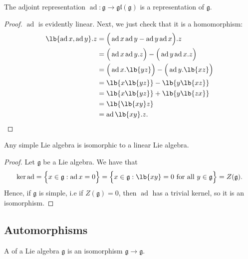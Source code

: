\documentclass{article}
\DeclarePairedDelimiter\lb\lbrack\rbrack
\newcommand*\ad{\operatorname{ad}}
\newcommand*\frkg{{\ensuremath{\mathfrak{g}}}}
\newcommand*\gl{\ensuremath{\mathfrak{gl}}}
\newcommand*\acts{.}
\begin{document}
\begin{theorem}
    The adjoint representation $\ad: \frkg \to \gl(\frkg)$ is a representation of $\frkg$.
\end{theorem}

\begin{proof}
    $\ad$ is evidently linear.
    Next, we just check that it is a homomorphism:
    \begin{align*}
        \lb{\ad x, \ad y} \acts z
        &=
        \Big(\ad x \ad y - \ad y \ad x\Big) \acts z 
        \\
        &=
        \Big(\ad x \ad y \acts z\Big) - \Big(\ad y \ad x \acts z\Big) 
        \\
        &=
        \Big(
            \ad x \acts \lb{yz}
        \Big)
        - 
        \Big(
            \ad y \acts \lb{xz}
        \Big)
        \\
        &=
        \lb{x\lb{yz}} - \lb{y\lb{xz}}
        \\
        &=
        \lb{x\lb{yz}} + \lb{y\lb{zx}}
        \\
        &=
        \lb{\lb{xy}z}
        \\
        &=
        \ad \lb{xy} \acts z.
    \end{align*}
\end{proof}

\begin{corollary}
    Any simple Lie algebra is isomorphic to a linear Lie algebra.
\end{corollary}

\begin{proof}
    Let $\frkg$ be a Lie algebra.
    We have that
    \[
        \ker \ad 
        =
        \Big\{
            x \in \frkg: \ad x = 0
        \Big\}
        =
        \Big\{
            x \in \frkg: \lb{xy} = 0 \text{ for all } y \in \frkg
        \Big\}
        =
        Z(\frkg).
    \]
    Hence, if $\frkg$ is simple, i.e if $Z(\frkg) = 0$, then $\ad$ has a trivial kernel, so it is an isomorphism. 
\end{proof}

\subsection{Automorphisms}

\begin{definition}
    A  of a Lie algebra $\frkg$ is an isomorphism $\frkg \to \frkg$.
\end{definition}
\end{document}
